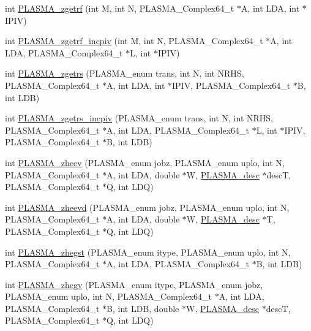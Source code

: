 \begin{DoxyCompactItemize}
\item 
int \hyperlink{group__PLASMA__Complex64__t_ga03449aa4e83b2f2223dad281d122697d_ga03449aa4e83b2f2223dad281d122697d}{PLASMA\_\-zgetrf} (int M, int N, PLASMA\_\-Complex64\_\-t $\ast$A, int LDA, int $\ast$IPIV)
\item 
int \hyperlink{group__PLASMA__Complex64__t_ga4853b0850dddb5702b2b48f0049d933d_ga4853b0850dddb5702b2b48f0049d933d}{PLASMA\_\-zgetrf\_\-incpiv} (int M, int N, PLASMA\_\-Complex64\_\-t $\ast$A, int LDA, PLASMA\_\-Complex64\_\-t $\ast$L, int $\ast$IPIV)
\item 
int \hyperlink{group__PLASMA__Complex64__t_gad7b041e52be07ced12ad09ca2c51ddc6_gad7b041e52be07ced12ad09ca2c51ddc6}{PLASMA\_\-zgetrs} (PLASMA\_\-enum trans, int N, int NRHS, PLASMA\_\-Complex64\_\-t $\ast$A, int LDA, int $\ast$IPIV, PLASMA\_\-Complex64\_\-t $\ast$B, int LDB)
\item 
int \hyperlink{group__PLASMA__Complex64__t_ga03b8805f6775c6c05bac527eb47e2ffa_ga03b8805f6775c6c05bac527eb47e2ffa}{PLASMA\_\-zgetrs\_\-incpiv} (PLASMA\_\-enum trans, int N, int NRHS, PLASMA\_\-Complex64\_\-t $\ast$A, int LDA, PLASMA\_\-Complex64\_\-t $\ast$L, int $\ast$IPIV, PLASMA\_\-Complex64\_\-t $\ast$B, int LDB)
\item 
int \hyperlink{group__PLASMA__Complex64__t_gad148e141c13feede49709370caea9c2a_gad148e141c13feede49709370caea9c2a}{PLASMA\_\-zheev} (PLASMA\_\-enum jobz, PLASMA\_\-enum uplo, int N, PLASMA\_\-Complex64\_\-t $\ast$A, int LDA, double $\ast$W, \hyperlink{typeplasma__desc__t}{PLASMA\_\-desc} $\ast$descT, PLASMA\_\-Complex64\_\-t $\ast$Q, int LDQ)
\item 
int \hyperlink{group__PLASMA__Complex64__t_gada171b7dc0b2147ce730f716f6ebd05d_gada171b7dc0b2147ce730f716f6ebd05d}{PLASMA\_\-zheevd} (PLASMA\_\-enum jobz, PLASMA\_\-enum uplo, int N, PLASMA\_\-Complex64\_\-t $\ast$A, int LDA, double $\ast$W, \hyperlink{typeplasma__desc__t}{PLASMA\_\-desc} $\ast$T, PLASMA\_\-Complex64\_\-t $\ast$Q, int LDQ)
\item 
int \hyperlink{group__PLASMA__Complex64__t_ga387eb7a21f8b3d03aec26324255e7510_ga387eb7a21f8b3d03aec26324255e7510}{PLASMA\_\-zhegst} (PLASMA\_\-enum itype, PLASMA\_\-enum uplo, int N, PLASMA\_\-Complex64\_\-t $\ast$A, int LDA, PLASMA\_\-Complex64\_\-t $\ast$B, int LDB)
\item 
int \hyperlink{group__PLASMA__Complex64__t_gaec004491cb00c99f63f9604c84ef8f43_gaec004491cb00c99f63f9604c84ef8f43}{PLASMA\_\-zhegv} (PLASMA\_\-enum itype, PLASMA\_\-enum jobz, PLASMA\_\-enum uplo, int N, PLASMA\_\-Complex64\_\-t $\ast$A, int LDA, PLASMA\_\-Complex64\_\-t $\ast$B, int LDB, double $\ast$W, \hyperlink{typeplasma__desc__t}{PLASMA\_\-desc} $\ast$descT, PLASMA\_\-Complex64\_\-t $\ast$Q, int LDQ)

\end{DoxyCompactItemize}
